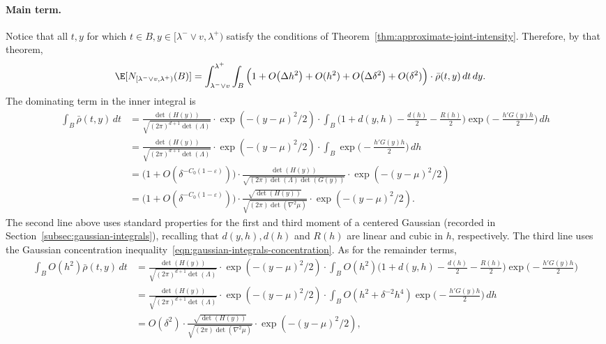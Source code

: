 \documentclass{article}
\begin{document}
	\paragraph{Main term.}
	Notice that all $t,y$ for which $t \in B, y \in [\lambda^{-} \vee v, \lambda^{+})$ satisfy the conditions of Theorem~\ref{thm:approximate-joint-intensity}.  Therefore, by that theorem,
	\begin{equation*}
		\begin{aligned}
			\E[N_{[\lambda^{-} \vee v, \lambda^{+})}(B)] & =  \int_{\lambda^{-} \vee v}^{\lambda^{+}} \int_{B} \Big(1 + O\big(\Delta h^2\big) + O(h^2) + O\big(\Delta\delta^2\big) + O(\delta^2)\Big) \cdot \bar{\rho}(t,y) \,dt \,dy.
		\end{aligned}
	\end{equation*}
	The dominating term in the inner integral is 
	\begin{equation*}
	\begin{aligned}
		\int_{B} \bar{\rho}(t,y) \,dt 
		& = \frac{\det(H(y))}{\sqrt{(2\pi)^{d + 1}\det(\Lambda)}} \cdot \exp(-(y - \mu)^2/2) \cdot \int_{B} \Big(1 + d(y,h) - \frac{d(h)}{2} - \frac{R(h)}{2}\Big) \exp\Big(-\frac{h'G(y)h}{2}\Big) \,dh \\
		& = \frac{\det(H(y))}{\sqrt{(2\pi)^{d + 1}\det(\Lambda)}} \cdot \exp(-(y - \mu)^2/2) \cdot \int_{B} \exp\Big(-\frac{h'G(y)h}{2}\Big) \,dh \\
		& = \Big(1 + O(\delta^{-C_0(1 - \varepsilon)})\Big) \cdot \frac{\det(H(y))}{\sqrt{(2\pi)\det(\Lambda) \det(G(y))}} \cdot \exp(-(y - \mu)^2/2) \\
		& = \Big(1 + O(\delta^{-C_0(1 - \varepsilon)})\Big) \cdot \frac{\sqrt{\det(H(y))}}{\sqrt{(2\pi)\det(\nabla^2\mu)}} \cdot \exp(-(y - \mu)^2/2).
	\end{aligned}
	\end{equation*}
	The second line above uses standard properties for the first and third moment of a centered Gaussian (recorded in Section~\ref{subsec:gaussian-integrals}), recalling that $d(y,h), d(h)$ and $R(h)$ are linear and cubic in $h$, respectively. The third line uses the Gaussian concentration inequality~\eqref{eqn:gaussian-integrals-concentration}. As for the remainder terms, 
	\begin{equation*}
	\begin{aligned}
		\int_B O(h^2) \bar{\rho}(t,y) \,dt
		& = \frac{\det(H(y))}{\sqrt{(2\pi)^{d + 1}\det(\Lambda)}} \cdot \exp(-(y - \mu)^2/2) \cdot \int_{B} O(h^2) \Big(1 + d(y,h) - \frac{d(h)}{2} - \frac{R(h)}{2}\Big) \exp\Big(-\frac{h'G(y)h}{2}\Big) \\
		& = \frac{\det(H(y))}{\sqrt{(2\pi)^{d + 1}\det(\Lambda)}} \cdot \exp(-(y - \mu)^2/2) \cdot \int_{B} O(h^2 + \delta^{-2}h^4) \exp\Big(-\frac{h'G(y)h}{2}\Big) \,dh \\
		& = O(\delta^2) \cdot \frac{\sqrt{\det(H(y))}}{\sqrt{(2\pi)\det(\nabla^2 \mu)}} \cdot \exp(-(y - \mu)^2/2),
	\end{aligned}
	\end{equation*}
\end{document}
